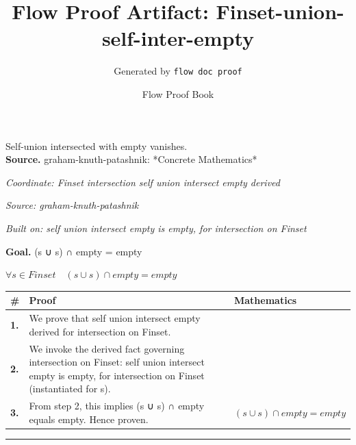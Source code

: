 \documentclass[11pt]{article}
\title{Flow Proof Artifact: Finset-union-self-inter-empty}
\author{Generated by \texttt{flow doc proof}}
\date{Flow Proof Book}
\theoremstyle{definition}
\begin{document}
\maketitle
Self-union intersected with empty vanishes.\\[0.5em]
\textbf{Source.} graham-knuth-patashnik: *Concrete Mathematics*\\[0.5em]
\bigskip
{}\par
\smallskip\noindent\textit{Coordinate: Finset \cdot intersection \cdot self union intersect empty derived}\par
\smallskip\noindent\textit{Source: graham-knuth-patashnik}\par
\smallskip\noindent\textit{Built on: self union intersect empty is empty, for intersection on Finset}\par
\medskip
\noindent\textbf{Goal.} (s ∪ s) ∩ empty = empty\par
\noindent$\displaystyle \forall s \in Finset\quad (s ∪ s) ∩ empty = empty$\par
\medskip
\noindent
\begin{tabular}{@{} >{\raggedright\arraybackslash}p{} >{\raggedright\arraybackslash}p{} >{\raggedleft\arraybackslash}p{} @{}}
\textbf{\#} & \textbf{Proof} & \textbf{Mathematics} \\
\midrule
\textbf{1.} & We prove that self union intersect empty derived for intersection on Finset. & \\[0.45em]
\textbf{2.} & We invoke the derived fact governing intersection on Finset: self union intersect empty is empty, for intersection on Finset (instantiated for s). & \\[0.45em]
\textbf{3.} & From step 2, this implies (s ∪ s) ∩ empty equals empty. Hence proven. & $\displaystyle (s ∪ s) ∩ empty = empty$ \\[0.45em]
\bottomrule
\end{tabular}
\label{thm:Finset-intersection-self_union_intersect_empty_derived}
\par\medskip\hrule
\end{document}
